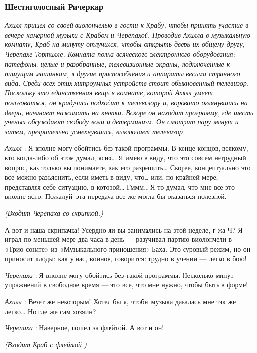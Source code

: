 \subsubsection{Шестиголосный Ричеркар}

\emph{Ахилл пришел со своей виолончелью в гости к Крабу, чтобы принять участие в вечере камерной музыки с Крабом и Черепахой. Проводив Ахилла в музыкальную комнату, Краб на минуту отлучился, чтобы открыть дверь их общему другу, Черепахе Тортилле. Комната полна всяческого электронного оборудования: патефоны, целые и разобранные, телевизионные экраны, подключенные к пишущим машинкам, и другие приспособления и аппараты весьма странного вида. Среди всех этих хитроумных устройств стоит обыкновенный телевизор. Поскольку это единственная вещь в комнате, которой Ахилл умеет пользоваться, он крадучись подходит к телевизору и, воровато оглянувшись на дверь, начинает нажимать на кнопки. Вскоре он находит программу, где шесть ученых обсуждают свободу воли и детерминизм. Он смотрит пару минут и затем, презрительно усмехнувшись, выключает телевизор.}

\emph{Ахилл} : Я вполне могу обойтись без такой программы. В конце концов, всякому, кто когда-либо об этом думал, ясно\ldots{} Я имею в виду, что это совсем нетрудный вопрос, как только вы понимаете, как его разрешить\ldots{} Скорее, концептуально это все можно разъяснить, если иметь в виду, что\ldots{} или, по крайней мере, представляя себе ситуацию, в которой\ldots{} Гммм\ldots{} Я-то думал, что мне все это вполне ясно. Пожалуй, эта передача все же могла бы оказаться полезной.

\emph{(Входит Черепаха со скрипкой.)}

А вот и наша скрипачка! Усердно ли вы занимались на этой неделе, г-жа Ч? Я играл по меньшей мере два часа в день --- разучивал партию виолончели в «Трио-сонате» из «Музыкального приношения» Баха. Это суровый режим, но он приносит плоды: как у нас, воинов, говорится: трудно в учении --- легко в бою!

\emph{Черепаха} : Я вполне могу обойтись без такой программы. Несколько минут упражнений в свободное время --- это все, что мне нужно, чтобы быть в форме!

\emph{Ахилл} : Везет же некоторым! Хотел бы я, чтобы музыка давалась мне так же легко\ldots{} Но где же сам хозяин?

\emph{Черепаха} : Наверное, пошел за флейтой. А вот и он!

\emph{(Входит Краб с флейтой.)}


